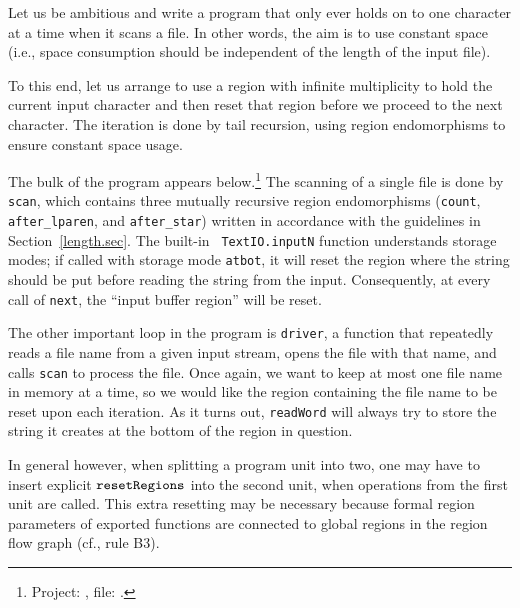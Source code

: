 \documentclass[12pt]{book}
\begin{document}
Let us be ambitious and write a program that only ever holds on to one
character at a time when it scans a file. In other words, the aim is
to use constant space (i.e., space consumption should be independent
of the length of the input file).

To this end, let us arrange to use a region with infinite multiplicity to
hold the current input character and then reset that region before we proceed
to the next character. The iteration is done by tail recursion, using region
endomorphisms to ensure constant space usage.

The bulk of the program appears below.\footnote{Project:
  , file: .} The
scanning of a single file is done by {\tt scan}, which contains three
mutually recursive region endomorphisms ({\tt count}, {\tt
  after\_lparen}, and {\tt after\_star}) written in accordance with
the guidelines in Section~\ref{length.sec}. The built-in {\tt
  TextIO.inputN} function understands storage modes; if called with
storage mode {\tt atbot}, it will reset the region where the string
should be put before reading the string from the input.  Consequently,
at every call of {\tt next}, the ``input buffer region'' will be
reset.

The other important loop in the program is {\tt driver}, a function
that repeatedly reads a file name from a given input stream, opens the
file with that name, and calls {\tt scan} to process the file. Once
again, we want to keep at most one file name in memory at a time, so
we would like the region containing the file name to be reset upon
each iteration.  As it turns out, {\tt readWord} will always try to
store the string it creates at the bottom of the region in question.

In general however, when splitting a program unit into two, one may
have to insert explicit $\hbox{\tt resetRegions}$ into the second unit, when
operations from the first unit are called. This extra resetting may be
necessary because formal region parameters of exported functions are
connected to global regions in the region flow graph (cf., rule B3).
\end{document}
